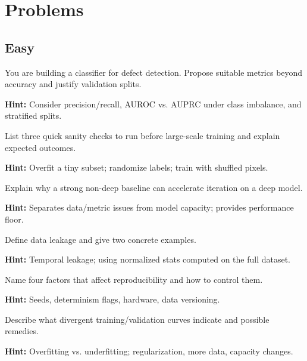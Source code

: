 
\section*{Problems}

\subsection*{Easy}

\begin{problem}
You are building a classifier for defect detection. Propose suitable metrics beyond accuracy and justify validation splits.

\textbf{Hint:} Consider precision/recall, AUROC vs. AUPRC under class imbalance, and stratified splits.
\end{problem}

\begin{problem}
List three quick sanity checks to run before large-scale training and explain expected outcomes.

\textbf{Hint:} Overfit a tiny subset; randomize labels; train with shuffled pixels.
\end{problem}

\begin{problem}
Explain why a strong non-deep baseline can accelerate iteration on a deep model.

\textbf{Hint:} Separates data/metric issues from model capacity; provides performance floor.
\end{problem}

\begin{problem}
Define data leakage and give two concrete examples.

\textbf{Hint:} Temporal leakage; using normalized stats computed on the full dataset.
\end{problem}

\begin{problem}[Reproducibility]
Name four factors that affect reproducibility and how to control them.

\textbf{Hint:} Seeds, determinism flags, hardware, data versioning.
\end{problem}

\begin{problem}
Describe what divergent training/validation curves indicate and possible remedies.

\textbf{Hint:} Overfitting vs. underfitting; regularization, more data, capacity changes.
\end{problem}

